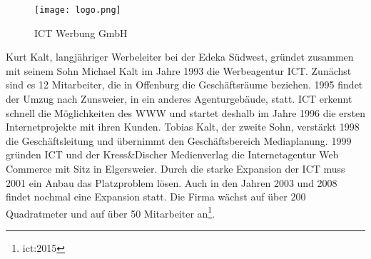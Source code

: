 \begin{wrapfigure}{r}{.4\textwidth}
\begin{center}
\texttt{[image: logo.png]}
\end{center}
\vspace{-15pt}
\caption{ICT Werbung GmbH\footnotemark}
\end{wrapfigure}

Kurt Kalt, langjähriger Werbeleiter bei der Edeka Südwest, gründet zusammen mit seinem Sohn Michael Kalt im Jahre 1993 die Werbeagentur ICT. Zunächst sind es 12 Mitarbeiter, die in Offenburg die Geschäftsräume beziehen. 1995 findet der Umzug nach Zunsweier, in ein anderes Agenturgebäude, statt. ICT erkennt schnell die Möglichkeiten des {WWW} und startet deshalb im Jahre 1996 die ersten Internetprojekte mit ihren Kunden. Tobias Kalt, der zweite Sohn, verstärkt 1998 die Geschäftsleitung und übernimmt den Geschäftsbereich Mediaplanung. 1999 gründen ICT und der Kress\&Discher Medienverlag die Internetagentur Web Commerce mit Sitz in Elgersweier. Durch die starke Expansion der ICT muss 2001 ein Anbau das Platzproblem lösen. Auch in den Jahren 2003 und 2008 findet nochmal eine Expansion statt. Die Firma wächst auf über 200 Quadratmeter und auf über 50 Mitarbeiter an\footnote{ict:2015}. 


